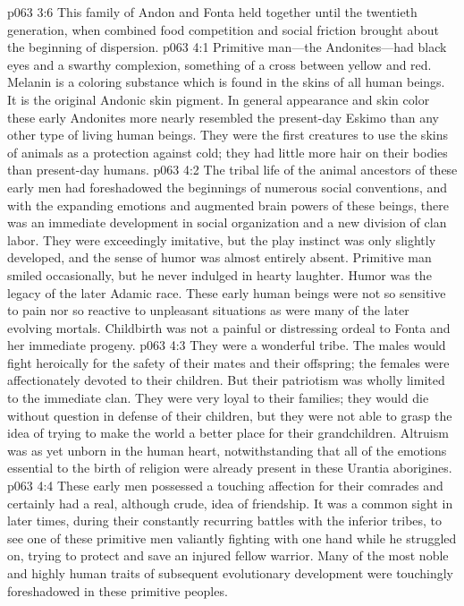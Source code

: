 \pc \vs p063 3:6 This family of Andon and Fonta held together until the twentieth generation, when combined food competition and social friction brought about the beginning of dispersion.
\vs p063 4:1 Primitive man---the Andonites---had black eyes and a swarthy complexion, something of a cross between yellow and red. Melanin is a coloring substance which is found in the skins of all human beings. It is the original Andonic skin pigment. In general appearance and skin color these early Andonites more nearly resembled the present\hyp{}day Eskimo than any other type of living human beings. They were the first creatures to use the skins of animals as a protection against cold; they had little more hair on their bodies than present\hyp{}day humans.
\vs p063 4:2 The tribal life of the animal ancestors of these early men had foreshadowed the beginnings of numerous social conventions, and with the expanding emotions and augmented brain powers of these beings, there was an immediate development in social organization and a new division of clan labor. They were exceedingly imitative, but the play instinct was only slightly developed, and the sense of humor was almost entirely absent. Primitive man smiled occasionally, but he never indulged in hearty laughter. Humor was the legacy of the later Adamic race. These early human beings were not so sensitive to pain nor so reactive to unpleasant situations as were many of the later evolving mortals. Childbirth was not a painful or distressing ordeal to Fonta and her immediate progeny.
\pc \vs p063 4:3 They were a wonderful tribe. The males would fight heroically for the safety of their mates and their offspring; the females were affectionately devoted to their children. But their patriotism was wholly limited to the immediate clan. They were very loyal to their families; they would die without question in defense of their children, but they were not able to grasp the idea of trying to make the world a better place for their grandchildren. Altruism was as yet unborn in the human heart, notwithstanding that all of the emotions essential to the birth of religion were already present in these Urantia aborigines.
\vs p063 4:4 These early men possessed a touching affection for their comrades and certainly had a real, although crude, idea of friendship. It was a common sight in later times, during their constantly recurring battles with the inferior tribes, to see one of these primitive men valiantly fighting with one hand while he struggled on, trying to protect and save an injured fellow warrior. Many of the most noble and highly human traits of subsequent evolutionary development were touchingly foreshadowed in these primitive peoples.
